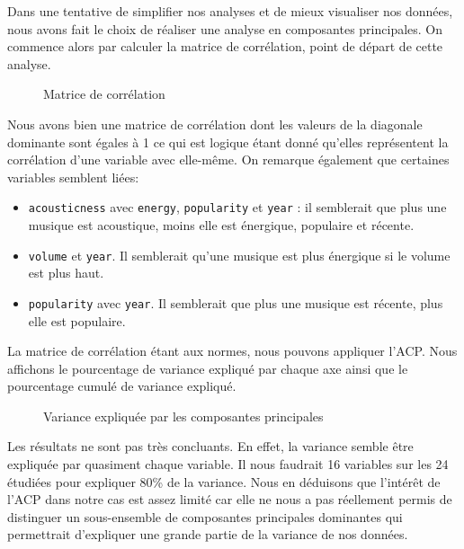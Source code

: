 \documentclass[a4paper, 12pt]{report}
\begin{document}
Dans une tentative de simplifier nos analyses et de mieux visualiser nos données, nous avons fait le choix de réaliser une analyse en composantes principales. On commence alors par calculer la matrice de corrélation, point de départ de cette analyse. 
\begin{figure} [h]
    \centering
    
    \caption{Matrice de corrélation}
    \label{fig:enter-label}
\end{figure}

Nous avons bien une matrice de corrélation dont les valeurs de la diagonale dominante sont égales à 1 ce qui est logique étant donné qu'elles représentent la corrélation d'une variable avec elle-même. On remarque également que certaines variables semblent liées:

\begin{itemize}
    \item \verb|acousticness| avec \verb|energy|, \verb|popularity| et \verb|year| : il semblerait que plus une musique est acoustique, moins elle est énergique, populaire et récente.
    \item \verb|volume| et \verb|year|. Il semblerait qu'une musique est plus énergique si le volume est plus haut.
    \item \verb|popularity| avec \verb|year|. Il semblerait que plus une musique est récente, plus elle est populaire.
\end{itemize}

La matrice de corrélation étant aux normes, nous pouvons appliquer l'ACP. Nous affichons le pourcentage de variance expliqué par chaque axe ainsi que le pourcentage cumulé de variance expliqué. 

\begin{figure} [h]
    \centering
    
    \caption{Variance expliquée par les composantes principales}
    \label{fig:enter-label}
\end{figure}

Les résultats ne sont pas très concluants. En effet, la variance semble être expliquée par quasiment chaque variable. Il nous faudrait 16 variables sur les 24 étudiées pour expliquer 80\% de la variance. Nous en déduisons que l'intérêt de l'ACP dans notre cas est assez limité car elle ne nous a pas réellement permis de distinguer un sous-ensemble de composantes principales dominantes qui permettrait d'expliquer une grande partie de la variance de nos données.
\end{document}
